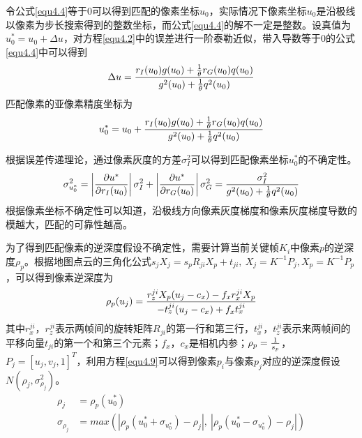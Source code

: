 令公式\eqref{equ4.4}等于$0$可以得到匹配的像素坐标$u_0$，实际情况下像素坐标$u_0$是沿极线以像素为步长搜索得到的整数坐标，而公式\eqref{equ4.4}的解不一定是整数。设真值为$u_0^*=u_0+\Delta u$，对方程\eqref{equ4.2}中的误差进行一阶泰勒近似，带入导数等于$0$的公式\eqref{equ4.4}中可以得到
\begin{equation}
\label{equ4.6}
\Delta u = {{ r_I(u_0) g(u_0)+ {1 \over \theta} r_G(u_0)q(u_0) } \over {g^2(u_0)+ { 1 \over \theta} q^2(u_0)}}
\end{equation}
匹配像素的亚像素精度坐标为
\begin{equation}
\label{equ4.7}
u_0^* = u_0 + {{ r_I(u_0) g(u_0)+ {1 \over \theta} r_G(u_0)q(u_0) } \over {g^2(u_0)+ { 1 \over \theta} q^2(u_0)}}
\end{equation}

根据误差传递理论，通过像素灰度的方差$\sigma_I^2$可以得到匹配像素坐标$u_0^*$的不确定性。
\begin{equation}
\label{equ4.8}
\sigma_{u_0^*}^2 = \left \vert { \partial u^* \over \partial r_I(u_0) }  \right \vert \sigma_I^2 + \left \vert { \partial u^* \over \partial r_G(u_0) }  \right \vert \sigma_G^2 = { \sigma_I^2 \over g^2(u_0) + {1 \over \theta} q^2(u_0) }
\end{equation}
根据像素坐标不确定性可以知道，沿极线方向像素灰度梯度和像素灰度梯度导数的模越大，匹配的可靠性越高。

为了得到匹配像素的逆深度假设不确定性，需要计算当前关键帧$K_i$中像素$p$的逆深度$\rho_p$。根据地图点云的三角化公式$s_jX_j = s_pR_{ji}X_p+t_{ji}, \  X_j = K^{-1}P_j, X_p = K^{-1}P_p$，可以得到像素逆深度为
\begin{equation}
\label{equ4.9}
\rho_p(u_j) = { r_z^{ji} X_p (u_j-c_x) - f_x r_x^{ji} X_p  \over - t_z^{ji}(u_j-c_x)+f_x t_x^{ji} }
\end{equation}
其中$r_x^{ji}$，$r_z^{ji}$表示两帧间的旋转矩阵$R_{ji}$的第一行和第三行，$t_x^{ji}$，$t_z^{ji}$表示来两帧间的平移向量$t_{ji}$的第一个和第三个元素；$f_x$，$c_x$是相机内参；$\rho_p = { 1 \over s_p}$，$P_j= \left [ u_j, v_j, 1 \right ] ^T$，利用方程\eqref{equ4.9}可以得到像素$p_i$与像素$p_j$对应的逆深度假设$N(\rho_j, \sigma_{\rho_j}^2)$。
\begin{equation}
\label{equ4.10}
\begin{aligned}
 \rho_j &= \rho_p(u_0^*) \\ 
 \sigma_{\rho_j} &= max \left( \left \vert  \rho_p(u_0^*+\sigma_{u_0^*})-\rho_j \right \vert , \  \left \vert  \rho_p(u_0^*-\sigma_{u_0^*})-\rho_j \right \vert \right)
\end{aligned}
\end{equation}

